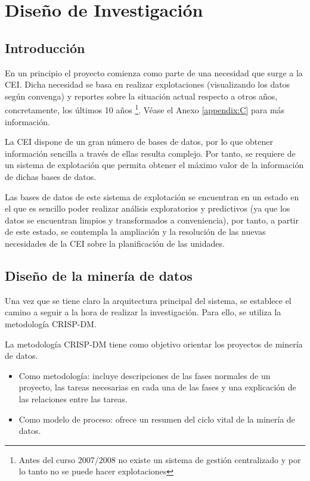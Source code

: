 \chapter{Diseño de Investigación}

\section{Introducción}
En un principio el proyecto comienza como parte de una necesidad que surge a la CEI. Dicha necesidad se basa en realizar explotaciones (visualizando los datos según convenga) y reportes sobre la situación actual respecto a otros años, concretamente, los últimos 10 años \footnote{Antes del curso 2007/2008 no existe un sistema de gestión centralizado y por lo tanto no se puede hacer explotaciones}. Véase el Anexo \ref{appendix:C} para más información.

La CEI dispone de un gran número de bases de datos, por lo que obtener información sencilla a través de ellas resulta complejo. Por tanto, se requiere de un sistema de explotación que permita obtener el máximo valor de la información de dichas bases de datos.

Las bases de datos de este sistema de explotación se encuentran en un estado en el que es sencillo poder realizar análisis exploratorios y predictivos (ya que los datos se encuentran limpios y transformados a conveniencia), por tanto, a partir de este estado, se contempla la ampliación y la resolución de las nuevas necesidades de la CEI sobre la planificación de las unidades.

\section{Diseño de la minería de datos}
Una vez que se tiene claro la arquitectura principal del sistema, se establece el camino a seguir a la hora de realizar la investigación. Para ello, se utiliza la metodología CRISP-DM. 

La metodología CRISP-DM tiene como objetivo orientar los proyectos de minería de datos. 
\begin{itemize}
	\item Como metodología: incluye descripciones de las fases normales de un proyecto, las tareas necesarias en cada una de las fases y una explicación de las relaciones entre las tareas.
	\item Como modelo de proceso: ofrece un resumen del ciclo vital de la minería de datos.
\end{itemize}

